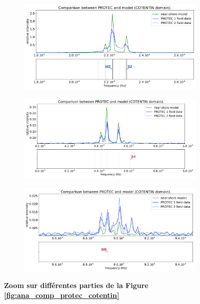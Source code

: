 \documentclass[10pt,a4paper,titlepage]{article}
\begin{document}
\begin{figure}[H]
	\centering
	\begin{subfigure}{0.45\linewidth}
		\centering
		\includegraphics[scale=0.22]{../images/post_traitement/COTENTIN_analyse_near-shore_zoom1.pdf}
	\end{subfigure}
	\begin{subfigure}{0.45\linewidth}
		\centering
		\includegraphics[scale=0.22]{../images/post_traitement/COTENTIN_analyse_near-shore_zoom2.pdf}
	\end{subfigure}
	\begin{subfigure}{0.45\linewidth}
		\centering
		\includegraphics[scale=0.22]{../images/post_traitement/COTENTIN_analyse_near-shore_zoom3.pdf}
	\end{subfigure}
	\caption{
		\textbf{Zoom sur différentes parties de la Figure \ref{fig:ana_comp_protec_cotentin}}
	}
	\label{fig:ana_comp_protec_cotentin_zoom}
\end{figure}
\end{document}
